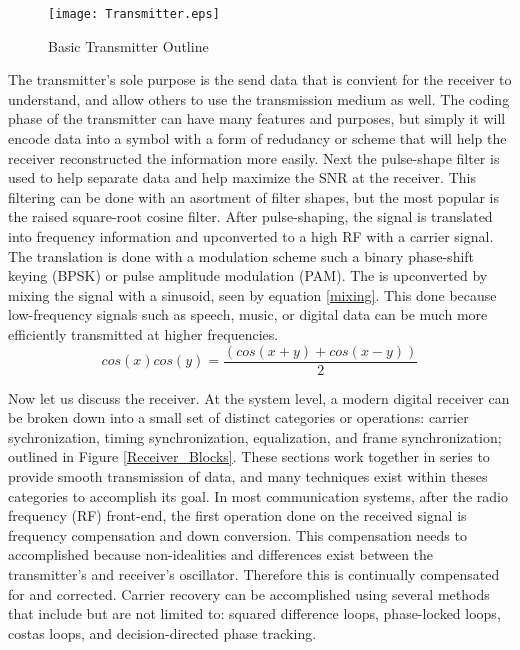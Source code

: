 \begin{figure}[!ht]\label{fig:Transmitter_System_Diagram}
\centering
\texttt{[image: Transmitter.eps]}
\caption{Basic Transmitter Outline}
\end{figure}

The transmitter's sole purpose is the send data that is convient for the receiver to understand, and allow others to use the transmission medium as well.  The coding phase of the transmitter can have many features and purposes, but simply it will encode data into a symbol with a form of redudancy or scheme that will help the receiver reconstructed the information more easily.  Next the pulse-shape filter is used to help separate data and help maximize the SNR at the receiver.  This filtering can be done with an asortment of filter shapes, but the most popular is the raised square-root cosine filter.  After pulse-shaping, the signal is translated into frequency information and upconverted to a high RF with a carrier signal.  The translation is done with a modulation scheme such a binary phase-shift keying (BPSK) or pulse amplitude modulation (PAM).  The is upconverted by mixing the signal with a sinusoid, seen by equation \eqref{mixing}.  This done because low-frequency signals such as speech, music, or digital data can be much more efficiently transmitted at higher frequencies\cite{9}.\\

\begin{equation}\label{mixing}
cos(x)cos(y)=\frac{(cos(x+y)+cos(x-y))}{2}
\end{equation}

Now let us discuss the receiver.  At the system level, a modern digital receiver can be broken down into a small set of distinct categories or operations: carrier sychronization, timing synchronization, equalization, and frame synchronization; outlined in Figure \ref{Receiver_Blocks}.  These sections work together in series to provide smooth transmission of data, and many techniques exist within theses categories to accomplish its goal.  In most communication systems, after the radio frequency (RF) front-end, the first operation done on the received signal is frequency compensation and down conversion.  This compensation needs to accomplished because non-idealities and differences exist between the transmitter's and receiver's oscillator.  Therefore this is continually compensated for and corrected.  Carrier recovery can be accomplished using several methods that include but are not limited to: squared difference loops, phase-locked loops, costas loops, and decision-directed phase tracking\cite{9}.\\

